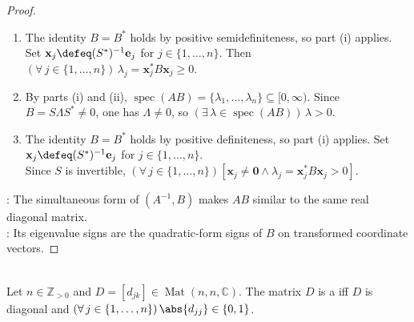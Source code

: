 \begin{corollary}
\begin{proof}
\begin{enumerate}[label=(\roman*)]
\item The identity $B=B^*$ holds by positive semidefiniteness, so part (i) applies.\\
Set $\mathbf{x}_j\defeq(S^*)^{-1}\mathbf{e}_j$ for $j\in\{1,\ldots,n\}$. Then $(\forall\,j\in\{1,\ldots,n\})\,\lambda_j=\mathbf{x}_j^*B\mathbf{x}_j\geq0$.
\item By parts (i) and (ii), $\operatorname{spec}(AB)=\{\lambda_1,\ldots,\lambda_n\}\subseteq[0,\infty)$. Since $B=S\Lambda S^*\neq0$, one has $\Lambda\neq0$, so $(\exists\,\lambda\in\operatorname{spec}(AB))\,\lambda>0$.
\item The identity $B=B^*$ holds by positive definiteness, so part (i) applies. Set $\mathbf{x}_j\defeq(S^*)^{-1}\mathbf{e}_j$ for $j\in\{1,\ldots,n\}$.\\
Since $S$ is invertible, $(\forall\,j\in\{1,\ldots,n\})[\mathbf{x}_j\neq\mathbf{0}\land\lambda_j=\mathbf{x}_j^*B\mathbf{x}_j>0]$.
\end{enumerate}
: The simultaneous form of $(A^{-1},B)$ makes $AB$ similar to the same real diagonal matrix.\\
: Its eigenvalue signs are the quadratic-form signs of $B$ on transformed coordinate vectors.
\end{proof}
\end{corollary}

\begin{definition} \label{def:phase-inertia-matrix} \\
Let $n\in\mathbb{Z}_{>0}$ and $D=[d_{jk}]\in\operatorname{Mat}(n,n,\mathbb{C})$. The matrix $D$ is a  iff $D$ is diagonal and $(\forall\,j\in\{1,\ldots,n\})\,\abs{d_{jj}}\in\{0,1\}$.
\end{definition}

